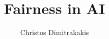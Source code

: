 \documentclass{beamer}
\title{Fairness in AI}
\author[C. Dimitrakakis]{Christos Dimitrakakis}
\begin{document}
\begin{frame}
  \titlepage
\end{frame}


\end{document}

